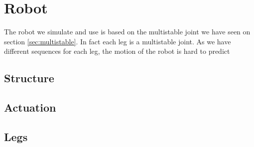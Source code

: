 \chapter{Robot}
    The robot we simulate and use is based on the multistable joint we have seen on section \ref{sec:multistable}. In fact each leg is a multistable joint. As we have different sequences for each leg, the motion of the robot is hard to predict
    \section{Structure}
    \section{Actuation}
    \section{Legs}